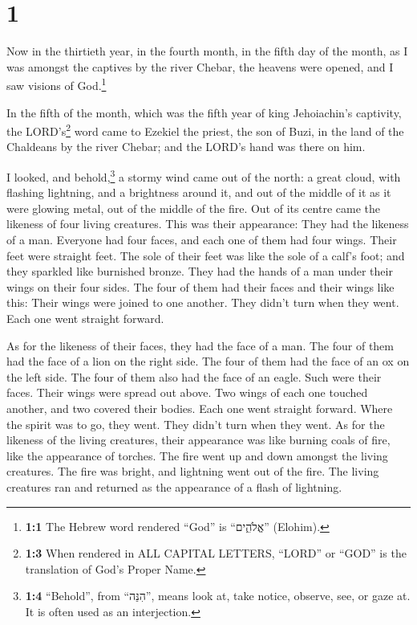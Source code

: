\hypertarget{section}{%
\section{1}\label{section}}

 Now in the thirtieth year, in the fourth month, in the
fifth day of the month, as I was amongst the captives by the river
Chebar, the heavens were opened, and I saw visions of God.\footnote{\textbf{1:1}
  The Hebrew word rendered ``God'' is ``אֱלֹהִ֑ים'' (Elohim).}

 In the fifth of the month, which was the fifth year of
king Jehoiachin's captivity,  the LORD's\footnote{\textbf{1:3}
  When rendered in ALL CAPITAL LETTERS, ``LORD'' or ``GOD'' is the
  translation of God's Proper Name.} word came to Ezekiel the priest,
the son of Buzi, in the land of the Chaldeans by the river Chebar; and
the LORD's hand was there on him.

 I looked, and behold,\footnote{\textbf{1:4} ``Behold'',
  from ``הִנֵּה'', means look at, take notice, observe, see, or gaze at.
  It is often used as an interjection.} a stormy wind came out of the
north: a great cloud, with flashing lightning, and a brightness around
it, and out of the middle of it as it were glowing metal, out of the
middle of the fire.  Out of its centre came the likeness
of four living creatures. This was their appearance: They had the
likeness of a man.  Everyone had four faces, and each one
of them had four wings.  Their feet were straight feet.
The sole of their feet was like the sole of a calf's foot; and they
sparkled like burnished bronze.  They had the hands of a
man under their wings on their four sides. The four of them had their
faces and their wings like this:  Their wings were joined
to one another. They didn't turn when they went. Each one went straight
forward.

 As for the likeness of their faces, they had the face of
a man. The four of them had the face of a lion on the right side. The
four of them had the face of an ox on the left side. The four of them
also had the face of an eagle.  Such were their faces.
Their wings were spread out above. Two wings of each one touched
another, and two covered their bodies.  Each one went
straight forward. Where the spirit was to go, they went. They didn't
turn when they went.  As for the likeness of the living
creatures, their appearance was like burning coals of fire, like the
appearance of torches. The fire went up and down amongst the living
creatures. The fire was bright, and lightning went out of the fire.
 The living creatures ran and returned as the appearance
of a flash of lightning.

